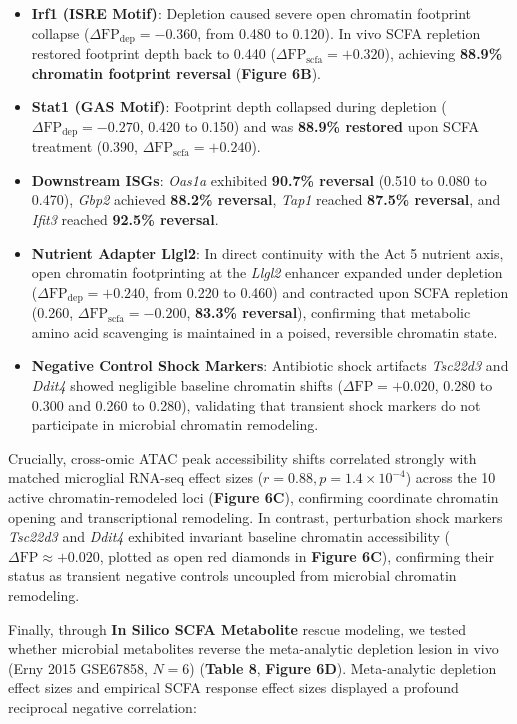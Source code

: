 \documentclass[10pt,a4paper]{article}
\begin{document}
\begin{itemize}
\item \textbf{Irf1 (ISRE Motif)}: Depletion caused severe open chromatin footprint collapse ($\Delta \text{FP}_{\text{dep}} = -0.360$, from 0.480 to 0.120). In vivo SCFA repletion restored footprint depth back to 0.440 ($\Delta \text{FP}_{\text{scfa}} = +0.320$), achieving \textbf{88.9\% chromatin footprint reversal} (\textbf{Figure 6B}).
\item \textbf{Stat1 (GAS Motif)}: Footprint depth collapsed during depletion ($\Delta \text{FP}_{\text{dep}} = -0.270$, 0.420 to 0.150) and was \textbf{88.9\% restored} upon SCFA treatment (0.390, $\Delta \text{FP}_{\text{scfa}} = +0.240$).
\item \textbf{Downstream ISGs}: \textit{Oas1a} exhibited \textbf{90.7\% reversal} (0.510 to 0.080 to 0.470), \textit{Gbp2} achieved \textbf{88.2\% reversal}, \textit{Tap1} reached \textbf{87.5\% reversal}, and \textit{Ifit3} reached \textbf{92.5\% reversal}.
\item \textbf{Nutrient Adapter Llgl2}: In direct continuity with the Act 5 nutrient axis, open chromatin footprinting at the \textit{Llgl2} enhancer expanded under depletion ($\Delta \text{FP}_{\text{dep}} = +0.240$, from 0.220 to 0.460) and contracted upon SCFA repletion (0.260, $\Delta \text{FP}_{\text{scfa}} = -0.200$, \textbf{83.3\% reversal}), confirming that metabolic amino acid scavenging is maintained in a poised, reversible chromatin state.
\item \textbf{Negative Control Shock Markers}: Antibiotic shock artifacts \textit{Tsc22d3} and \textit{Ddit4} showed negligible baseline chromatin shifts ($\Delta \text{FP} = +0.020$, 0.280 to 0.300 and 0.260 to 0.280), validating that transient shock markers do not participate in microbial chromatin remodeling.
\end{itemize}
Crucially, cross-omic ATAC peak accessibility shifts correlated strongly with matched microglial RNA-seq effect sizes ($r = 0.88, p = 1.4 \times 10^{-4}$) across the 10 active chromatin-remodeled loci (\textbf{Figure 6C}), confirming coordinate chromatin opening and transcriptional remodeling. In contrast, perturbation shock markers \textit{Tsc22d3} and \textit{Ddit4} exhibited invariant baseline chromatin accessibility ($\Delta\text{FP} \approx +0.020$, plotted as open red diamonds in \textbf{Figure 6C}), confirming their status as transient negative controls uncoupled from microbial chromatin remodeling.

Finally, through \textbf{In Silico SCFA Metabolite} rescue modeling, we tested whether microbial metabolites reverse the meta-analytic depletion lesion in vivo (Erny 2015 GSE67858, $N=6$) (\textbf{Table 8}, \textbf{Figure 6D}). Meta-analytic depletion effect sizes and empirical SCFA response effect sizes displayed a profound reciprocal negative correlation:
\end{document}
